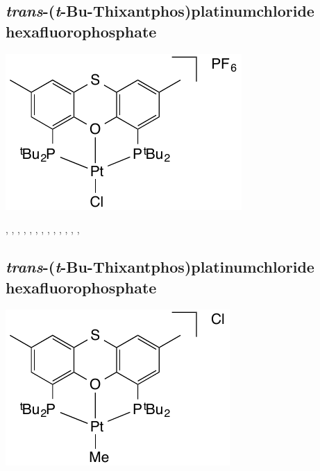 \subsection*{\emph{trans}-(\emph{t}-Bu-Thixantphos)platinumchloride hexafluorophosphate}
\begin{structure}[h]
\begin{center}
\includegraphics{../Structures/StBuPtClPF6.pdf}
\end{center}
\end{structure}

,
,
,
,
,
,
,
,
,
,
,
,
,

\subsection*{\emph{trans}-(\emph{t}-Bu-Thixantphos)platinumchloride hexafluorophosphate}
\begin{structure}[h]
\begin{center}
\includegraphics{../Structures/StBuPtMe.pdf}
\end{center}
\end{structure}

